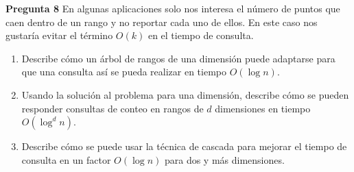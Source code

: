 \textbf{Pregunta 8}
En algunas aplicaciones solo nos interesa el número de puntos que caen dentro de un rango
y no reportar cada uno de ellos. En este caso nos gustaría evitar el término $O(k)$ en el tiempo de consulta.

\begin{enumerate}
\item Describe cómo un árbol de rangos de una dimensión puede adaptarse para que una consulta así se pueda
  realizar en tiempo $O(\log n)$.
\item Usando la solución al problema para una dimensión, describe cómo se pueden responder consultas de
  conteo en rangos de $d$ dimensiones en tiempo $O(\log^d n)$.
\item Describe cómo se puede usar la técnica de cascada para mejorar el tiempo de consulta en un factor
  $O(\log n)$ para dos y más dimensiones.
\end{enumerate}


